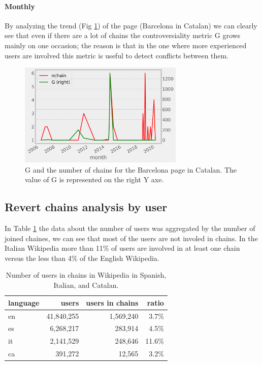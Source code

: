 \paragraph*{Monthly}
By analyzing the trend (Fig \ref{fig:chainsuser}) of the page (Barcelona in Catalan) we can clearly
see that even if there are a lot of chains the controversiality metric G grows mainly on one
occasion; the reason is that in the one where more experienced users are involved this metric is useful
to detect conflicts between them.
\begin{figure}[H]
    \centering
    \includegraphics[width=0.7\textwidth]{./chapters/04/assets/chains_page.png}
    \caption{G and the number of chains for the Barcelona page in Catalan. The value of G is represented on the right Y axe.}
    \label{fig:chainsuser}
\end{figure}

\subsection{Revert chains analysis by user}
In Table \ref{table:userinchains} the data about the number of users was aggregated by the number of
joined chaines, we can see that most of the users are not involed in chains. In the Italian Wikipedia
more than 11\% of users are involved in at least one chain versus the less than 4\% of the English Wikipedia.

\begin{table}[H]
    \centering
    \begin{tabularx}{\columnwidth}{@{}Xrrr@{}}
        \midrule
        \textbf{language}& \textbf{users} & \textbf{users in chains} & \textbf{ratio} \\ \toprule
        en &41,840,255&1,569,240&3.7\%\\
        es &6,268,217& 283,914&4.5\% \\
        it &2,141,529& 248,646 &11.6\% \\
        ca &391,272& 12,565 & 3.2\% \\
    
        \bottomrule
    \end{tabularx}
    
    \caption{Number of users in chains in Wikipedia in Spanish, Italian, and Catalan. \label{table:userinchains}}
\end{table}

